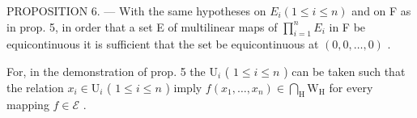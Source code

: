 PROPOSITION 6. --- With the same hypotheses on \(E_{i}(1 \leqslant i \leqslant n)\) and on F as in prop. 5, in order that a set E of multilinear maps of \(\prod_{i=1}^{n} E_{i}\) in F be equicontinuous it is sufficient that the set be equicontinuous at \((0, 0, \ldots, 0)\) .

For, in the demonstration of prop. 5 the \(\mathrm{U}_i\) ( \(1 \leqslant i \leqslant n\) ) can be taken such that the relation \(x_i \in \mathrm{U}_i\) ( \(1 \leqslant i \leqslant n\) ) imply \(f(x_1, \ldots, x_n) \in \bigcap_{\mathrm{H}} \mathrm{W}_{\mathrm{H}}\) for every mapping \(f \in \mathcal{E}\) .

